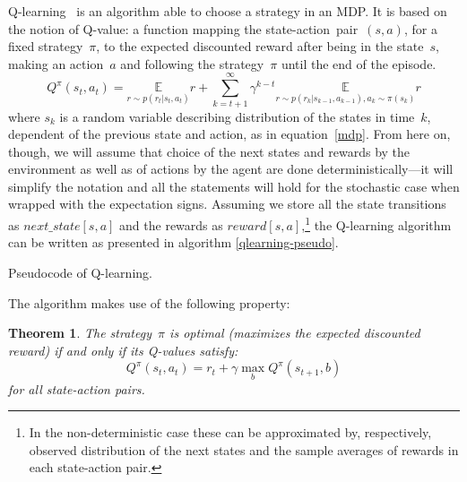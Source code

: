 Q-learning~\cite{qlearning} is an algorithm able to choose a strategy in an MDP. It is based on the notion of Q-value: a function mapping the state-action~pair~$(s, a)$, for a fixed strategy~$\pi$, to the expected discounted reward after being in the state~$s$, making an action~$a$ and following the strategy~$\pi$ until the end of the episode.
\begin{equation}\label{q-value}
  Q^\pi(s_t, a_t) = \underset{r\sim p(r_t | s_t, a_t)}{\mathbb{E}} r + \sum_{k=t+1}^\infty \gamma^{k-t}\underset{r\sim p(r_k|s_{k-1}, a_{k-1}), a_k\sim \pi(s_k)}{\mathbb{E}} r
\end{equation}
where $s_k$ is a random variable describing distribution of the states in time~$k$, dependent of the previous state and action, as in equation~\eqref{mdp}. From here on, though, we will assume that choice of the next states and rewards by the environment as well as of actions by the agent are done deterministically---it will simplify the notation and all the statements will hold for the stochastic case when wrapped with the expectation signs. Assuming we store all the state transitions as $next\_state[s, a]$ and the rewards as $reward[s, a]$,\footnote{In the non-deterministic case these can be approximated by, respectively, observed distribution of the next states and the sample averages of rewards in each state-action pair.} the Q-learning algorithm can be written as presented in algorithm \ref{qlearning-pseudo}.

\begin{algorithm} \label{qlearning-pseudo}
  \caption{Pseudocode of Q-learning.}
\end{algorithm}

The algorithm makes use of the following property:

\theoremstyle{theorem}
\newtheorem{theorem}{Theorem}
\begin{theorem}\label{qlearning-theorem}
The strategy~$\pi$ is optimal (maximizes the expected discounted reward) if and only if its Q-values satisfy:
\begin{equation}\label{qlearning-property}
  Q^\pi(s_t, a_t) = r_t + \gamma \max_b Q^\pi(s_{t+1}, b)
\end{equation}
for all state-action pairs.
\end{theorem}

